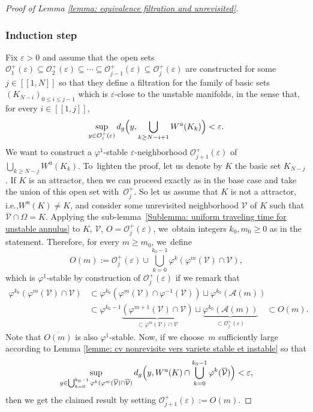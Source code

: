 \documentclass[11pt]{article}
\newcommand{\ie}{i.e.,\xspace}
\let\oldbigcup\bigcup
\newcommand{\lcr}{[\![}
\newcommand{\rcr}{]\!]}
\newcommand{\ru}{\mathrm{u}}
\theoremstyle{definition}
\theoremstyle{plain}
\newcommand{\Acal}{\mathcal{A}}
\newcommand{\Ocal}{\mathcal{O}}
\newcommand{\Vcal}{\mathcal{V}}
\begin{document}
\begin{proof}[Proof of Lemma \ref{lemma: equivalence filtration and unrevisited}]
\subsubsection*{Induction step}
Fix $\varepsilon > 0$ and assume that the open sets $\Ocal_1^+ (\varepsilon) \subseteq \Ocal_2^+ (\varepsilon) \subseteq \cdots \subseteq \Ocal_{j-1}^+ (\varepsilon) \subseteq \Ocal_j^+ (\varepsilon)$ are constructed for some $j\in\lcr1,N\rcr$ so that they define a filtration for the family of basic sets $(K_{N-i})_{0 \leq i \leq j-1}$ which is $\varepsilon$-close to the unstable manifolds, in the sense that, for every $i\in\lcr1,j\rcr$,
\[
\sup_{y \in \Ocal_i^+ (\varepsilon)} d_g \Bigl(y, \bigcup_{k \geq N- i +1} W^\ru (K_{k}) \Bigr) < \varepsilon.
\]
We want to construct a $\varphi^1$-stable $\varepsilon$-neighborhood $\Ocal_{j+1}^+ (\varepsilon)$ of $\bigcup_{k \geq N-j} W^\ru (K_{k})$. To~lighten the proof, let us denote by $K$ the basic set $K_{N-j}$. If $K$ is an attractor, then we can proceed exactly as in the base case and take the union of this open set with~$\mathcal{O}_{j}^+$. So let us assume that $K$ is not a attractor, \ie $W^\ru (K) \neq K$, and consider some unrevisited neighborhood $\Vcal$ of $K$ such that $\overline{\Vcal} \cap \Omega = K$. Applying the sub-lemma~\ref{Sublemma: uniform traveling time for unstable annulus} to $K$, $\Vcal$, $O = \Ocal_j^+ (\varepsilon)$, we~obtain integers $k_0, m_0 \geq 0$ as in the statement. Therefore, for every $m \geq m_0$, we~define
\[
O (m):= \Ocal_j^+ (\varepsilon) \cup \bigcup_{k = 0}^{k_0 - 1} \varphi^{k} (\varphi^{m} (\Vcal) \cap \Vcal),
\]
which is $\varphi^1$-stable by construction of $\Ocal_j^+ (\varepsilon)$ if we remark that
\begin{align*}
\varphi^{k_0} (\varphi^{m} (\Vcal) \cap \Vcal) &\subset \varphi^{ k_0} \left(\varphi^{m} (\Vcal) \cap \varphi^{-1} (\Vcal)\right) \sqcup \varphi^{k_0}\left(\Acal (m)\right) \\
&\subset \varphi^{ k_0 - 1} \underbrace{\left(\varphi^{m+1} (\Vcal) \cap \Vcal \right)}_{\subset \varphi^{m} (\Vcal) \cap \Vcal} \sqcup \underbrace{\varphi^{k_0}\left(\Acal (m)\right)}_{\subset \Ocal_j^+ (\varepsilon)} \quad \subset O (m).
\end{align*}
Note that $\overline{O (m)}$ is also $\varphi^1$-stable. Now, if we choose~$m$ sufficiently large according to Lemma \ref{lemme: cv nonrevisite vers variete stable et instable} so that
\[
\sup_{y \in \oldbigcup_{k = 0}^{k_0 - 1} \varphi^{k} (\varphi^{m} (\overline{\Vcal}) \cap \overline{\Vcal})}d_g \Bigl(y, W^\ru (K) \cap \bigcup_{k = 0}^{k_0 - 1} \varphi^k (\overline{\Vcal}) \Bigr) < \varepsilon,
\]
then we get the claimed result by setting $\Ocal_{j+1}^+ (\varepsilon):= O (m)$.
\end{proof}
\end{document}
